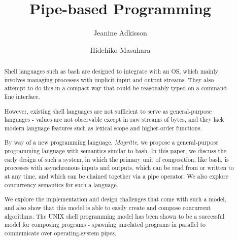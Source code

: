 \documentclass[sigplan,10pt,nosumlimits]{acmart}
\title{Pipe-based Programming}
\author{Jeanine Adkisson}
\affiliation{\institution{Tokyo Institute of Technology}}
\author{Hidehiko Masuhara}
\affiliation{\institution{Tokyo Institute of Technology}}
\begin{document}

\begin{abstract}
Shell languages such as bash are designed to integrate with an OS, which mainly involves managing processes with implicit input and output streams. They also attempt to do this in a compact way that could be reasonably typed on a command-line interface.

However, existing shell languages are not sufficient to serve as general-purpose languages - values are not observable except in raw streams of bytes, and they lack modern language features such as lexical scope and higher-order functions.

By way of a new programming language, \emph{Magritte}, we propose a general-purpose programming language with semantics similar to bash. In this paper, we discuss the early design of such a system, in which the primary unit of composition, like bash, is processes with asynchronous inputs and outputs, which can be read from or written to at any time, and which can be chained together via a pipe operator. We also explore concurrency semantics for such a language.

We explore the implementation and design challenges that come with such a model, and also show that this model is able to easily create and compose concurrent algorithms.
The UNIX shell programming model has been shown to be a successful model for composing programs - spawning unrelated programs in parallel to communicate over operating-system pipes.


\end{abstract}
\end{document}
